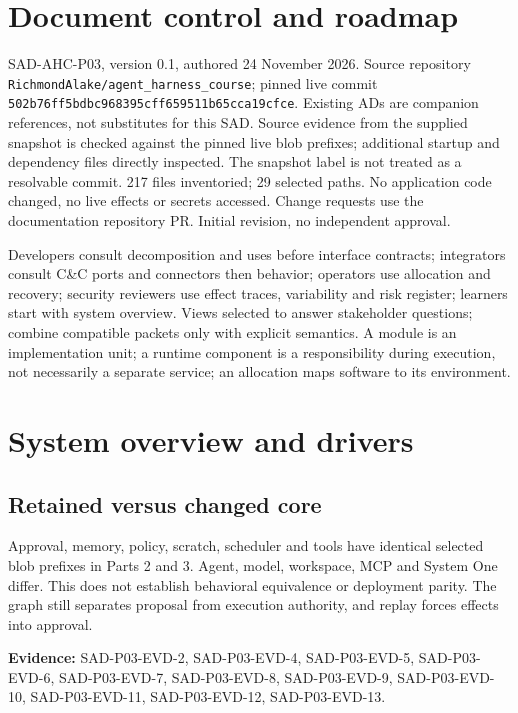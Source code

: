 \documentclass[10pt,letterpaper]{article}
\begin{document}
\makedoctitle
\tableofcontents
\listoffigures
\listoftables
\clearpage
\section{Document control and roadmap}
SAD-AHC-P03, version 0.1, authored 24 November 2026. Source repository \nolinkurl{RichmondAlake/agent_harness_course}; pinned live commit \nolinkurl{502b76ff5bdbc968395cff659511b65cca19cfce}. Existing ADs are companion references, not substitutes for this SAD. Source evidence from the supplied snapshot is checked against the pinned live blob prefixes; additional startup and dependency files directly inspected. The snapshot label is not treated as a resolvable commit. 217 files inventoried; 29 selected paths. No application code changed, no live effects or secrets accessed. Change requests use the documentation repository PR. Initial revision, no independent approval.
\par Developers consult decomposition and uses before interface contracts; integrators consult C\&C ports and connectors then behavior; operators use allocation and recovery; security reviewers use effect traces, variability and risk register; learners start with system overview. Views selected to answer stakeholder questions; combine compatible packets only with explicit semantics. A module is an implementation unit; a runtime component is a responsibility during execution, not necessarily a separate service; an allocation maps software to its environment.
\section{System overview and drivers}
\subsection{Retained versus changed core}
Approval, memory, policy, scratch, scheduler and tools have identical selected blob prefixes in Parts 2 and 3. Agent, model, workspace, MCP and System One differ. This does not establish behavioral equivalence or deployment parity. The graph still separates proposal from execution authority, and replay forces effects into approval.\par\textbf{Evidence:} SAD-P03-EVD-2, SAD-P03-EVD-4, SAD-P03-EVD-5, SAD-P03-EVD-6, SAD-P03-EVD-7, SAD-P03-EVD-8, SAD-P03-EVD-9, SAD-P03-EVD-10, SAD-P03-EVD-11, SAD-P03-EVD-12, SAD-P03-EVD-13.\par
\end{document}
